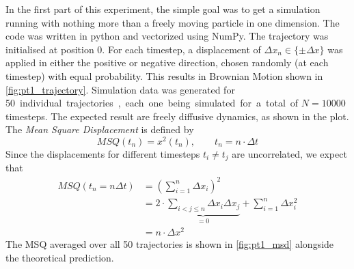 \documentclass[
    parskip=half, 
    twoside=false,
    twocolumn=true,
    fontsize=11pt,
]{scrarticle}
\begin{document}
In the first part of this experiment, the simple goal was to get a simulation running with nothing more than a freely moving particle in one dimension. The code was written in python and vectorized using NumPy. The trajectory was initialised at position \SI{0}{}. For each timestep, a displacement of $\Delta x_n \in \{\pm \Delta x\}$ was applied in either the positive or negative direction, chosen randomly (at each timestep) with equal probability. This results in Brownian Motion shown in \autoref{fig:pt1_trajectory}. Simulation data was generated for \SI{50} individual trajectories, each one being simulated for a total of $N=\SI{10000}{}$ timesteps. The expected result are freely diffusive dynamics, as shown in the plot. The \textit{Mean Square Displacement} is defined by
\begin{equation}
 MSQ(t_n) = x^2(t_n), \qquad t_n = n \cdot \Delta t
\end{equation}
Since the displacements for different timesteps $t_i\neq t_j$ are uncorrelated, we expect that
\begin{align}
 MSQ(t_n = n \Delta t) &= \left(\sum_{i=1}^n \Delta x_i\right)^2 \\&= 2 \cdot \underbrace{\sum_{i<j\leq n} \Delta x_i \Delta x_j}_{=0} + \sum_{i=1}^n \Delta x_i^2 \\ &= n \cdot \Delta x^2
\end{align}
The MSQ averaged over all \SI{50}{} trajectories is shown in \autoref{fig:pt1_msd} alongside the theoretical prediction.
\end{document}
